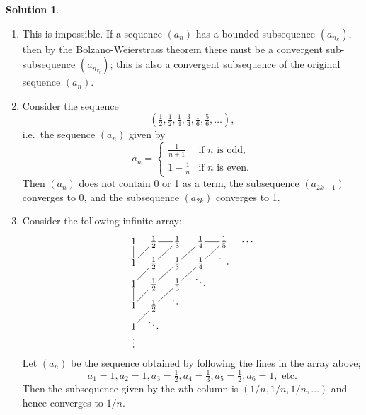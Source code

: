 \documentclass[12pt]{article}
\theoremstyle{definition}
\theoremstyle{exercise}
\theoremstyle{solution}
\newtheorem*{solution}{Solution}
\begin{document}
\begin{solution}
    \begin{enumerate}
        \item This is impossible. If a sequence \( (a_n) \) has a bounded subsequence \( (a_{n_k}) \), then by the Bolzano-Weierstrass theorem there must be a convergent sub-subsequence \( (a_{n_{k_l}}) \); this is also a convergent subsequence of the original sequence \( (a_n) \).

        \item Consider the sequence
        \[
            \left( \tfrac{1}{2}, \tfrac{1}{2}, \tfrac{1}{4}, \tfrac{3}{4}, \tfrac{1}{6}, \tfrac{5}{6}, \ldots \right),
        \]
        i.e.\ the sequence \( (a_n) \) given by
        \[
            a_n = \begin{cases}
                \frac{1}{n+1} & \text{if } n \text{ is odd}, \\
                1 - \frac{1}{n} & \text{if } n \text{ is even}.
            \end{cases}
        \]
        Then \( (a_n) \) does not contain 0 or 1 as a term, the subsequence \( (a_{2k - 1}) \) converges to 0, and the subsequence \( (a_{2k}) \) converges to 1.

        \item Consider the following infinite array:
        \[
            \begin{tikzpicture}
                \matrix[matrix of math nodes,inner sep=1pt,row sep=1pt,column sep=1em] (M)
                {
                    1 & \tfrac{1}{2} & \tfrac{1}{3} & \tfrac{1}{4} & \tfrac{1}{5} & \cdots \\
                    1 & \tfrac{1}{2} & \tfrac{1}{3} & \tfrac{1}{4} & \ddots \\
                    1 & \tfrac{1}{2} & \tfrac{1}{3} & \ddots \\
                    1 & \tfrac{1}{2} & \ddots \\
                    1 & \ddots \\
                    \vdots \\
                }
                ;
                \draw[-] (M-1-1) -- (M-2-1) -- (M-1-2) -- (M-1-3) -- (M-2-2) -- (M-3-1) -- (M-4-1) -- (M-3-2) -- (M-2-3) -- (M-1-4) -- (M-1-5) -- (M-2-4) -- (M-3-3) -- (M-4-2) -- (M-5-1);
            \end{tikzpicture}
        \]
        Let \( (a_n) \) be the sequence obtained by following the lines in the array above;
        \[
            a_1 = 1, a_2 = 1, a_3 = \tfrac{1}{2}, a_4 = \tfrac{1}{3}, a_5 = \tfrac{1}{2}, a_6 = 1, \text{ etc}.
        \]
        Then the subsequence given by the \(n\)th column is \( (1/n, 1/n, 1/n, \ldots) \) and hence converges to \( 1/n \).


\end{enumerate}
\end{solution}
\end{document}
